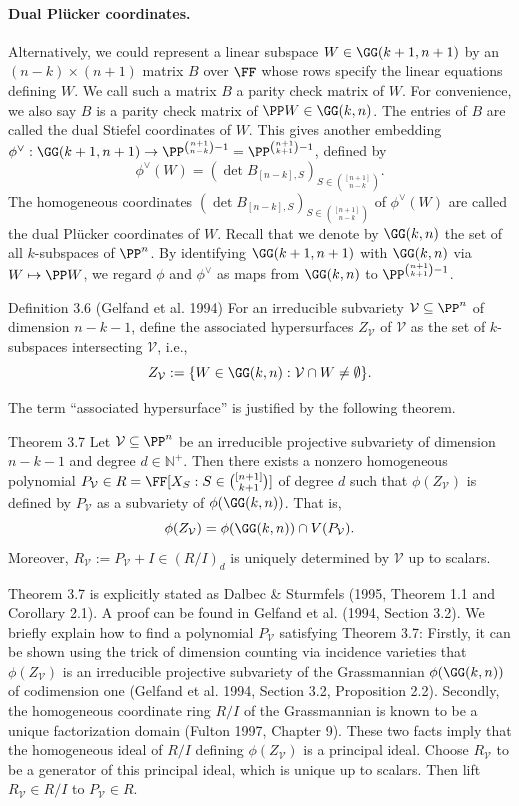 \paragraph{Dual Pl\"ucker coordinates.}
Alternatively, we could represent a linear subspace $W\in\GG(k+1,n+1)$ by an $(n-k)\times(n+1)$ matrix $B$ over $\FF$ whose rows specify the linear equations defining $W$. We call such a matrix $B$ a parity check matrix of $W$. For convenience, we also say $B$ is a parity check matrix of $\PP W\in\GG(k,n)$.
The entries of $B$ are called the dual Stiefel coordinates of $W$. This gives another embedding $\phi^\vee:\GG(k+1,n+1)\to\PP^{\binom{n+1}{n-k}-1}=\PP^{\binom{n+1}{k+1}-1}$, defined by
\[\phi^\vee(W)=(\det B_{[n-k],S})_{S\in\binom{[n+1]}{n-k}}.\]
The homogeneous coordinates $(\det B_{[n-k],S})_{S\in\binom{[n+1]}{n-k}}$ of $\phi^\vee(W)$ are called the dual Pl\"ucker coordinates of $W$.
Recall that we denote by $\GG(k,n)$ the set of all $k$-subspaces of $\PP^n$. By identifying $\GG(k+1,n+1)$ with $\GG(k,n)$ via $W\mapsto\PP W$, we regard $\phi$ and $\phi^\vee$ as maps from $\GG(k,n)$ to $\PP^{\binom{n+1}{k+1}-1}$.
\begin{result}{Definition 3.6 (Gelfand et al. 1994)}
For an irreducible subvariety $\mathcal V\subseteq\PP^n$ of dimension $n-k-1$, define the associated hypersurfaces $Z_{\mathcal V}$ of $\mathcal V$ as the set of $k$-subspaces intersecting $\mathcal V$, i.e.,
\[Z_{\mathcal V}:=\{W\in\GG(k,n):\mathcal V\cap W\ne\emptyset\}.\]
\end{result}
The term ``associated hypersurface'' is justified by the following theorem.
\begin{result}{Theorem 3.7}
Let $\mathcal V\subseteq\PP^n$ be an irreducible projective subvariety of dimension $n-k-1$ and degree $d\in\mathbb N^+$. Then there exists a nonzero homogeneous polynomial $P_{\mathcal V}\in R=\FF[X_S:S\in\binom{[n+1]}{k+1}]$ of degree $d$ such that $\phi(Z_{\mathcal V})$ is defined by $P_{\mathcal V}$ as a subvariety of $\phi(\GG(k,n))$. That is,
\[\phi(Z_{\mathcal V})=\phi(\GG(k,n))\cap V(P_{\mathcal V}).\]
Moreover, $R_{\mathcal V}:=P_{\mathcal V}+I\in(R/I)_d$ is uniquely determined by $\mathcal V$ up to scalars.
\end{result}
Theorem 3.7 is explicitly stated as Dalbec \& Sturmfels (1995, Theorem 1.1 and Corollary 2.1). A proof can be found in Gelfand et al. (1994, Section 3.2). We briefly explain how to find a polynomial $P_{\mathcal V}$ satisfying Theorem 3.7: Firstly, it can be shown using the trick of dimension counting via incidence varieties that $\phi(Z_{\mathcal V})$ is an irreducible projective subvariety of the Grassmannian $\phi(\GG(k,n))$ of codimension one (Gelfand et al. 1994, Section 3.2, Proposition 2.2). Secondly, the homogeneous coordinate ring $R/I$ of the Grassmannian is known to be a unique factorization domain (Fulton 1997, Chapter 9). These two facts imply that the homogeneous ideal of $R/I$ defining $\phi(Z_{\mathcal V})$ is a principal ideal. Choose $R_{\mathcal V}$ to be a generator of this principal ideal, which is unique up to scalars. Then lift $R_{\mathcal V}\in R/I$ to $P_{\mathcal V}\in R$.
